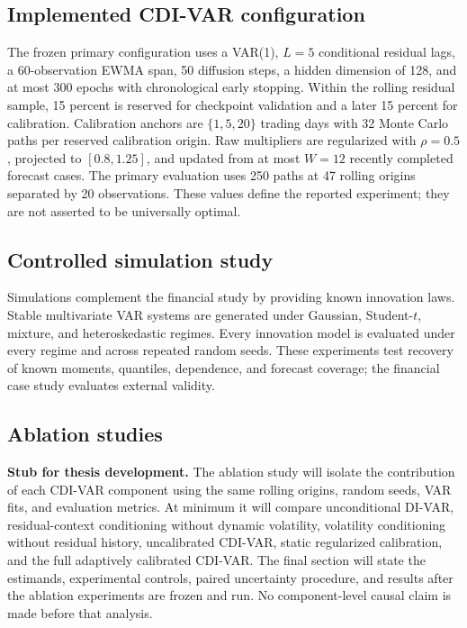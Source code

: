\documentclass[11pt]{article}
\begin{document}
\subsection{Implemented CDI-VAR configuration}

The frozen primary configuration uses a VAR(1), $L=5$ conditional residual lags, a 60-observation EWMA span, 50 diffusion steps, a hidden dimension of 128, and at most 300 epochs with chronological early stopping. Within the rolling residual sample, 15 percent is reserved for checkpoint validation and a later 15 percent for calibration. Calibration anchors are $\{1,5,20\}$ trading days with 32 Monte Carlo paths per reserved calibration origin. Raw multipliers are regularized with $\rho=0.5$, projected to $[0.8,1.25]$, and updated from at most $W=12$ recently completed forecast cases. The primary evaluation uses 250 paths at 47 rolling origins separated by 20 observations. These values define the reported experiment; they are not asserted to be universally optimal.

\subsection{Controlled simulation study}

Simulations complement the financial study by providing known innovation laws. Stable multivariate VAR systems are generated under Gaussian, Student-$t$, mixture, and heteroskedastic regimes. Every innovation model is evaluated under every regime and across repeated random seeds. These experiments test recovery of known moments, quantiles, dependence, and forecast coverage; the financial case study evaluates external validity.

\subsection{Ablation studies}

\textbf{Stub for thesis development.} The ablation study will isolate the contribution of each CDI-VAR component using the same rolling origins, random seeds, VAR fits, and evaluation metrics. At minimum it will compare unconditional DI-VAR, residual-context conditioning without dynamic volatility, volatility conditioning without residual history, uncalibrated CDI-VAR, static regularized calibration, and the full adaptively calibrated CDI-VAR. The final section will state the estimands, experimental controls, paired uncertainty procedure, and results after the ablation experiments are frozen and run. No component-level causal claim is made before that analysis.
\end{document}
